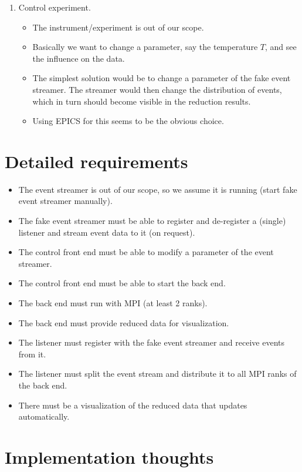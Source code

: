 \documentclass[a4paper,english,numbers=noenddot,bibliography=totoc,chapterprefix=on,DIV=12]{scrartcl}
\newcommand{\epics}{EPICS\xspace}
\begin{document}
\begin{enumerate}
\begin{itemize}
    \end{itemize}
  \item Control experiment.
    \begin{itemize}
      \item The instrument/experiment is out of our scope.
      \item Basically we want to change a parameter, say the temperature $T$, and see the influence on the data.
      \item The simplest solution would be to change a parameter of the fake event streamer.
        The streamer would then change the distribution of events, which in turn should become visible in the reduction results.
      \item Using \epics for this seems to be the obvious choice.
    \end{itemize}
\end{enumerate}


\section{Detailed requirements}

\begin{itemize}
  \item The event streamer is out of our scope, so we assume it is running (start fake event streamer manually).
  \item The fake event streamer must be able to register and de-register a (single) listener and stream event data to it (on request).
  \item The control front end must be able to modify a parameter of the event streamer.
  \item The control front end must be able to start the back end.
  \item The back end must run with MPI (at least 2 ranks).
  \item The back end must provide reduced data for visualization.
  \item The listener must register with the fake event streamer and receive events from it.
  \item The listener must split the event stream and distribute it to all MPI ranks of the back end.
  \item There must be a visualization of the reduced data that updates automatically.
\end{itemize}


\section{Implementation thoughts}
\end{document}
